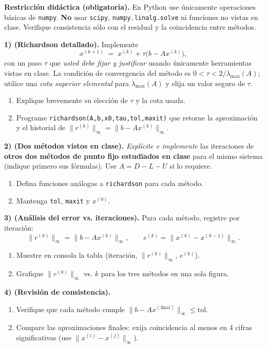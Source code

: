 \documentclass[11pt,a4paper]{article}
\begin{document}
\textbf{Restricción didáctica (obligatoria).} En Python use únicamente operaciones básicas de \texttt{numpy}. \textbf{No} usar \texttt{scipy}, \texttt{numpy.linalg.solve} ni funciones no vistas en clase. Verifique consistencia sólo con el residual y la coincidencia entre métodos.

\medskip
\noindent\textbf{1) (Richardson detallado).} 
Implemente
\[
x^{(k+1)} \;=\; x^{(k)}+\tau\bigl(b-Ax^{(k)}\bigr),
\]
con un paso $\tau$ que \emph{usted debe fijar y justificar} usando únicamente herramientas vistas en clase.  La condición de convergencia del m\'etodo es $0<\tau<2/\lambda_{\max}(A)$; utilice una \emph{cota superior elemental} para $\lambda_{\max}(A)$ y elija un valor seguro de $\tau$.
\begin{enumerate}
\item[(a)] Explique brevemente su elección de $\tau$ y la cota usada.
\item[(b)] Programe \texttt{richardson(A,b,x0,tau,tol,maxit)} que retorne la aproximación y el historial de $\|r^{(k)}\|_\infty=\|b-Ax^{(k)}\|_\infty$.
\end{enumerate}

\medskip
\noindent\textbf{2) (Dos métodos vistos en clase).} 
\emph{Explícite e implemente} las iteraciones de \textbf{otros dos métodos de punto fijo estudiados en clase} para el mismo sistema (indique primero sus fórmulas). Use $A=D-L-U$ si lo requiere.
\begin{enumerate}
\item[(a)] Defina funciones análogas a \texttt{richardson} para cada método.
\item[(b)] Mantenga \texttt{tol}, \texttt{maxit} y $x^{(0)}$.
\end{enumerate}

\medskip
\noindent\textbf{3) (Análisis del error vs. iteraciones).} 
Para cada método, registre por iteración:
\[
\|r^{(k)}\|_\infty=\|b-Ax^{(k)}\|_\infty, \qquad
e^{(k)}=\|x^{(k)}-x^{(k-1)}\|_\infty.
\]
\begin{enumerate}
\item[(a)] Muestre en consola la tabla (iteración, $\|r^{(k)}\|_\infty$, $e^{(k)}$).
\item[(b)] Grafique $\|r^{(k)}\|_\infty$ vs. $k$ para los tres métodos en una sola figura.
\end{enumerate}

\medskip
\noindent\textbf{4) (Revisión de consistencia).} 
\begin{enumerate}
\item[(a)] Verifique que cada método cumple $\|b-Ax^{(\text{final})}\|_\infty \le \text{tol}$.
\item[(b)] Compare las aproximaciones finales: exija coincidencia al menos en 4 cifras significativas (use $\|x^{(i)}-x^{(j)}\|_\infty$).
\end{enumerate}
\end{document}
